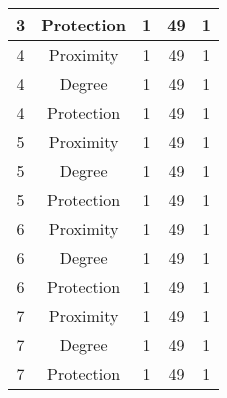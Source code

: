 \documentclass[results.tex]{subfiles}
\begin{document}
\begin{center}
\begin{tabular}{| c || c | c | c | c |}
            \hline
            3                       & Protection                   & 1                      & 49                      & 1                    \\
            \hline
            4                       & Proximity                    & 1                      & 49                      & 1                    \\
            \hline
            4                       & Degree                       & 1                      & 49                      & 1                    \\
            \hline
            4                       & Protection                   & 1                      & 49                      & 1                    \\
            \hline
            5                       & Proximity                    & 1                      & 49                      & 1                    \\
            \hline
            5                       & Degree                       & 1                      & 49                      & 1                    \\
            \hline
            5                       & Protection                   & 1                      & 49                      & 1                    \\
            \hline
            6                       & Proximity                    & 1                      & 49                      & 1                    \\
            \hline
            6                       & Degree                       & 1                      & 49                      & 1                    \\
            \hline
            6                       & Protection                   & 1                      & 49                      & 1                    \\
            \hline
            7                       & Proximity                    & 1                      & 49                      & 1                    \\
            \hline
            7                       & Degree                       & 1                      & 49                      & 1                    \\
            \hline
            7                       & Protection                   & 1                      & 49                      & 1                    \\

\end{tabular}
\end{center}
\end{document}
